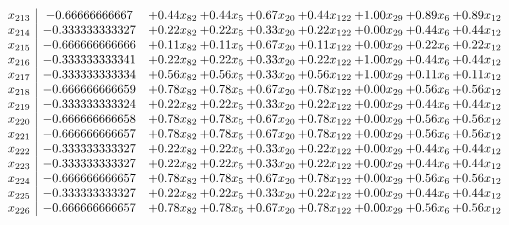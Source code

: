 \documentclass[8pt]{article}
\begin{document}
\[\begin{array}{c| c c@{\hskip 2pt} c@{\hskip 2pt} c@{\hskip 2pt} c@{\hskip 2pt} c@{\hskip 2pt} c@{\hskip 2pt} c@{\hskip 2pt} }
 x_{213}   &  -0.66666666667 & +  0.44 x_{82} & +  0.44 x_{5} & +  0.67 x_{20} & +  0.44 x_{122} & +  1.00 x_{29} & +  0.89 x_{6} & +  0.89 x_{12}\\
 x_{214}   &  -0.333333333327 & +  0.22 x_{82} & +  0.22 x_{5} & +  0.33 x_{20} & +  0.22 x_{122} & +  0.00 x_{29} & +  0.44 x_{6} & +  0.44 x_{12}\\
 x_{215}   &  -0.666666666666 & +  0.11 x_{82} & +  0.11 x_{5} & +  0.67 x_{20} & +  0.11 x_{122} & +  0.00 x_{29} & +  0.22 x_{6} & +  0.22 x_{12}\\
 x_{216}   &  -0.333333333341 & +  0.22 x_{82} & +  0.22 x_{5} & +  0.33 x_{20} & +  0.22 x_{122} & +  1.00 x_{29} & +  0.44 x_{6} & +  0.44 x_{12}\\
 x_{217}   &  -0.333333333334 & +  0.56 x_{82} & +  0.56 x_{5} & +  0.33 x_{20} & +  0.56 x_{122} & +  1.00 x_{29} & +  0.11 x_{6} & +  0.11 x_{12}\\
 x_{218}   &  -0.666666666659 & +  0.78 x_{82} & +  0.78 x_{5} & +  0.67 x_{20} & +  0.78 x_{122} & +  0.00 x_{29} & +  0.56 x_{6} & +  0.56 x_{12}\\
 x_{219}   &  -0.333333333324 & +  0.22 x_{82} & +  0.22 x_{5} & +  0.33 x_{20} & +  0.22 x_{122} & +  0.00 x_{29} & +  0.44 x_{6} & +  0.44 x_{12}\\
 x_{220}   &  -0.666666666658 & +  0.78 x_{82} & +  0.78 x_{5} & +  0.67 x_{20} & +  0.78 x_{122} & +  0.00 x_{29} & +  0.56 x_{6} & +  0.56 x_{12}\\
 x_{221}   &  -0.666666666657 & +  0.78 x_{82} & +  0.78 x_{5} & +  0.67 x_{20} & +  0.78 x_{122} & +  0.00 x_{29} & +  0.56 x_{6} & +  0.56 x_{12}\\
 x_{222}   &  -0.333333333327 & +  0.22 x_{82} & +  0.22 x_{5} & +  0.33 x_{20} & +  0.22 x_{122} & +  0.00 x_{29} & +  0.44 x_{6} & +  0.44 x_{12}\\
 x_{223}   &  -0.333333333327 & +  0.22 x_{82} & +  0.22 x_{5} & +  0.33 x_{20} & +  0.22 x_{122} & +  0.00 x_{29} & +  0.44 x_{6} & +  0.44 x_{12}\\
 x_{224}   &  -0.666666666657 & +  0.78 x_{82} & +  0.78 x_{5} & +  0.67 x_{20} & +  0.78 x_{122} & +  0.00 x_{29} & +  0.56 x_{6} & +  0.56 x_{12}\\
 x_{225}   &  -0.333333333327 & +  0.22 x_{82} & +  0.22 x_{5} & +  0.33 x_{20} & +  0.22 x_{122} & +  0.00 x_{29} & +  0.44 x_{6} & +  0.44 x_{12}\\
 x_{226}   &  -0.666666666657 & +  0.78 x_{82} & +  0.78 x_{5} & +  0.67 x_{20} & +  0.78 x_{122} & +  0.00 x_{29} & +  0.56 x_{6} & +  0.56 x_{12}\\

\end{array}\]
\end{document}
